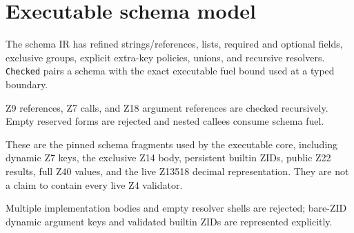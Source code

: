 \chapter{Executable schema model}\label{ch:schema}

\begin{definition}\label{def:schema-ir}
  \leanok
  The schema IR has refined strings/references, lists, required and optional fields, exclusive
  groups, explicit extra-key policies, unions, and recursive resolvers.  \texttt{Checked} pairs a
  schema with the exact executable fuel bound used at a typed boundary.
\end{definition}

\begin{definition}\label{def:resolver-schema}
  \leanok
  Z9 references, Z7 calls, and Z18 argument references are checked recursively.  Empty reserved
  forms are rejected and nested callees consume schema fuel.
\end{definition}

\begin{definition}\label{def:core-schemas}
  \leanok
  These are the pinned schema fragments used by the executable core, including dynamic Z7 keys,
  the exclusive Z14 body, persistent builtin ZIDs, public Z22 results, full Z40 values, and the
  live Z13518 decimal representation.  They are not a claim to contain every live Z4 validator.
\end{definition}

\begin{lemma}\label{lem:schema-rejections}
  \leanok
  Multiple implementation bodies and empty resolver shells are rejected; bare-ZID dynamic
  argument keys and validated builtin ZIDs are represented explicitly.
\end{lemma}

